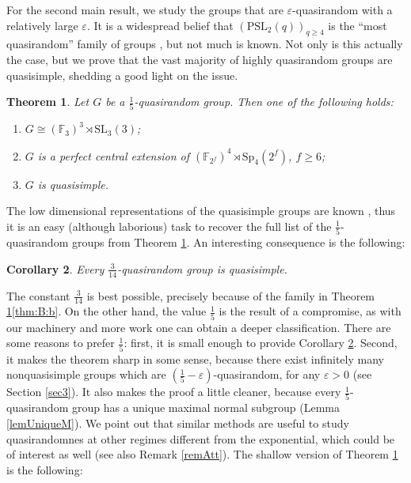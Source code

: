 \documentclass{daj}
\newtheorem{theoremX}{Theorem}
\newtheorem{corollaryX}[theoremX]{Corollary}
\theoremstyle{definition}
\theoremstyle{remark}
\newcommand{\PSL}{\mathrm{PSL}}
\newcommand{\Sp}{\mathrm{Sp}}
\newcommand{\SL}{\mathrm{SL}}
\begin{document}
For the second main result, we study the groups that are $\varepsilon$-quasirandom with a relatively large $\varepsilon$.
It is a widespread belief that $(\PSL_2(q))_{q \geq 4}$ is the ``most quasirandom'' family of groups \cite{MO1,MO2},
but not much is known.
Not only is this actually the case, but we prove that the vast majority of highly quasirandom groups are quasisimple,
shedding a good light on the issue.
	
	\begin{theoremX} \label{thm:B} 
		Let $G$ be a $\frac{1}{5}$-quasirandom group. Then one of the following holds:
		\begin{enumerate}[$(a)$]
		\item \label{thm:B:a} $G \cong (\mathbb{F}_3)^3 \rtimes \SL_3(3)$;
		\item \label{thm:B:b} $G$ is a perfect central extension of $(\mathbb{F}_{2^f})^4 \rtimes \Sp_4(2^f)$, $f \geq 6$;
		\item \label{thm:B:c} $G$ is quasisimple.
		\end{enumerate}
	\end{theoremX} 
	
	The low dimensional representations of the quasisimple groups are known \cite{Tie03},
	thus it is an easy (although laborious) task to recover the full list of the $\frac{1}{5}$-quasirandom groups from Theorem \ref{thm:B}.
	An interesting consequence is the following:
	
	\begin{corollaryX} \label{cor:3/14}
		Every $\frac{3}{14}$-quasirandom group is quasisimple.
	\end{corollaryX}
	
	The constant $\frac{3}{14}$ is best possible, precisely because of the family in Theorem \ref{thm:B}\ref{thm:B:b}.
	On the other hand, the value $\frac{1}{5}$ is the result of a compromise,
	as with our machinery and more work one can obtain a deeper classification.
	There are some reasons to prefer $\frac{1}{5}$:
	first, it is small enough to provide Corollary \ref{cor:3/14}.
	Second, it makes the theorem sharp in some sense,
	because there exist infinitely many nonquasisimple groups which are $(\frac{1}{5} -\varepsilon)$-quasirandom,
	for any $\varepsilon>0$ (see Section \ref{sec3}).
	It also makes the proof a little cleaner,
	because every $\frac{1}{5}$-quasirandom group has a unique maximal normal subgroup (Lemma \ref{lemUniqueM}).
	We point out that similar methods are useful to study quasirandomnes at other regimes different from the exponential,
	which could be of interest as well (see also Remark \ref{remAtt}).
	The shallow version of Theorem \ref{thm:B} is the following:
	
\end{document}
